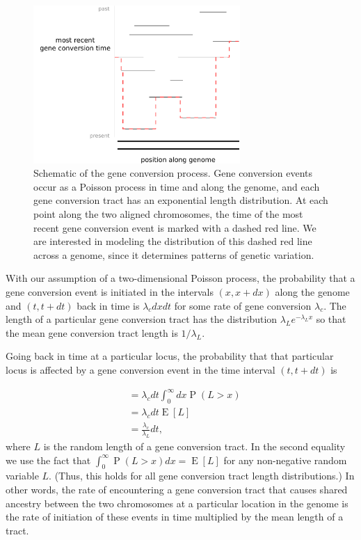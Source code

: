 \documentclass{article}
\DeclareMathOperator{\Prob}{P}
\DeclareMathOperator{\E}{E}
\begin{document}
\begin{figure}
    \centering
    \includegraphics[width=0.7\textwidth]{figs/geneconversion.pdf}
    \caption{
        Schematic of the gene conversion process. Gene conversion events occur
        as a Poisson process in time and along the genome, and each gene
        conversion tract has an exponential length distribution. At each point
        along the two aligned chromosomes, the time of the most recent gene
        conversion event is marked with a dashed red line. We are interested in
        modeling the distribution of this dashed red line across a genome,
        since it determines patterns of genetic variation.}
    \label{fig:geneconversiondiagram}
\end{figure}

With our assumption of a two-dimensional Poisson process, the probability that
a gene conversion event is initiated in the intervals $(x, x+dx)$ along the
genome and $(t,t+dt)$ back in time is $\lambda_c dxdt$ for some rate of gene
conversion $\lambda_c$. The length of a particular gene conversion tract has
the distribution $\lambda_Le^{-\lambda_Lx}$ so that the mean gene conversion
tract length is $1/\lambda_L$.

Going back in time at a particular locus, the probability that that particular
locus is affected by a gene conversion event in the time interval $(t, t+dt)$
is 

\begin{align*}
    &= \lambda_c dt \int_0^{\infty} dx \Prob(L>x)\\
    &= \lambda_c dt \E[L]\\
    &= \frac{\lambda_c}{\lambda_L}dt,
\end{align*}
where $L$ is the random length of a gene conversion tract. In the second
equality we use the fact that $\int_0^\infty \Prob(L>x)dx = \E[L]$ for any
non-negative random variable $L$. (Thus, this holds for all gene conversion
tract length distributions.) In other words, the rate of
encountering a gene conversion tract that causes shared ancestry between the
two chromosomes at a particular location in the genome is the rate of
initiation of these events in time multiplied by the mean length of a tract.
\end{document}
